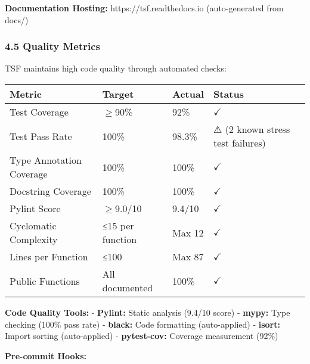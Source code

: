 \documentclass[
]{article}
\newcounter{none} %
\begin{document}
\textbf{Documentation Hosting:} https://tsf.readthedocs.io
(auto-generated from docs/)

\subsubsection{4.5 Quality Metrics}\label{quality-metrics}

TSF maintains high code quality through automated checks:

{\def\LTcaptype{none} %
\begin{longtable}[]{@{}llll@{}}
\toprule\noalign{}
Metric & Target & Actual & Status \\
\midrule\noalign{}
\endhead
\bottomrule\noalign{}
\endlastfoot
Test Coverage & $\geq$90\% & 92\% & $\checkmark$ \\
Test Pass Rate & 100\% & 98.3\% & ⚠ (2 known stress test failures) \\
Type Annotation Coverage & 100\% & 100\% & $\checkmark$ \\
Docstring Coverage & 100\% & 100\% & $\checkmark$ \\
Pylint Score & $\geq$9.0/10 & 9.4/10 & $\checkmark$ \\
Cyclomatic Complexity & ≤15 per function & Max 12 & $\checkmark$ \\
Lines per Function & ≤100 & Max 87 & $\checkmark$ \\
Public Functions & All documented & 100\% & $\checkmark$ \\
\end{longtable}
}

\textbf{Code Quality Tools:} - \textbf{Pylint:} Static analysis (9.4/10
score) - \textbf{mypy:} Type checking (100\% pass rate) -
\textbf{black:} Code formatting (auto-applied) - \textbf{isort:} Import
sorting (auto-applied) - \textbf{pytest-cov:} Coverage measurement
(92\%)

\textbf{Pre-commit Hooks:}
\end{document}

